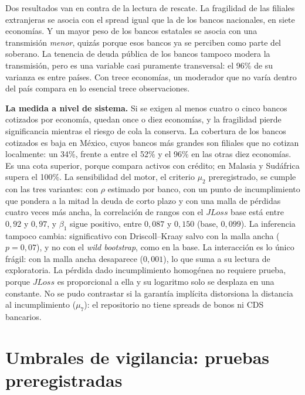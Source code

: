 Dos resultados van en contra de la lectura de rescate. La fragilidad de las filiales extranjeras se asocia con el spread igual que la de los bancos nacionales, en siete economías. Y un mayor peso de los bancos estatales se asocia con una transmisión \emph{menor}, quizás porque esos bancos ya se perciben como parte del soberano. La tenencia de deuda pública de los bancos tampoco modera la transmisión, pero es una variable casi puramente transversal: el 96\% de su varianza es entre países. Con trece economías, un moderador que no varía dentro del país compara en lo esencial trece observaciones.

\textbf{La medida a nivel de sistema.} Si se exigen al menos cuatro o cinco bancos cotizados por economía, quedan once o diez economías, y la fragilidad pierde significancia mientras el riesgo de cola la conserva. La cobertura de los bancos cotizados es baja en México, cuyos bancos más grandes son filiales que no cotizan localmente: un 34\%, frente a entre el 52\% y el 96\% en las otras diez economías. Es una cota superior, porque compara activos con crédito; en Malasia y Sudáfrica supera el 100\%. La sensibilidad del motor, el criterio $\mu_{2}$ preregistrado, se cumple con las tres variantes: con $\rho$ estimado por banco, con un punto de incumplimiento que pondera a la mitad la deuda de corto plazo y con una malla de pérdidas cuatro veces más ancha, la correlación de rangos con el $JLoss$ base está entre $0{,}92$ y $0{,}97$, y $\beta_1$ sigue positivo, entre $0{,}087$ y $0{,}150$ (base, $0{,}099$). La inferencia tampoco cambia: significativo con Driscoll--Kraay salvo con la malla ancha ($p=0{,}07$), y no con el \textit{wild bootstrap}, como en la base. La interacción es lo único frágil: con la malla ancha desaparece ($0{,}001$), lo que suma a su lectura de exploratoria. La pérdida dado incumplimiento homogénea no requiere prueba, porque $JLoss$ es proporcional a ella y su logaritmo solo se desplaza en una constante. No se pudo contrastar si la garantía implícita distorsiona la distancia al incumplimiento ($\mu_{7}$): el repositorio no tiene spreads de bonos ni CDS bancarios.


\section{Umbrales de vigilancia: pruebas preregistradas}
\label{sec:umbrales-prereg}

